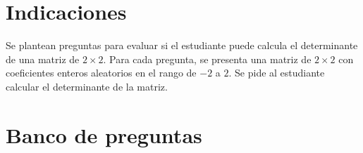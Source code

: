\documentclass[a4,11pt]{aleph-notas}
\begin{document}
\encabezado

\vspace*{-8mm}
\section{Indicaciones}

Se plantean preguntas para evaluar si el estudiante puede calcula el determinante de una matriz de $2 \times 2$. Para cada pregunta, se presenta una matriz de $2 \times 2$ con coeficientes enteros aleatorios en el rango de $-2$ a $2$. Se pide al estudiante calcular el determinante de la matriz.








\section{Banco de preguntas}
\end{document}
